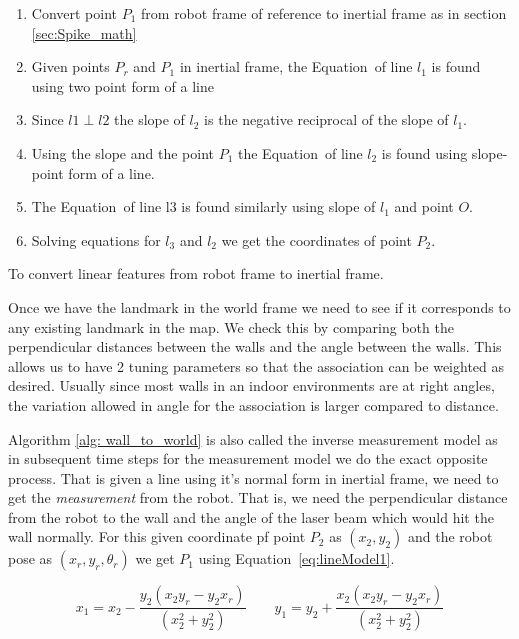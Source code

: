 \begin{algorithm}[]
	\begin{enumerate}
		\item Convert point $ P_1 $ from robot frame of reference to inertial frame as in section \ref{sec:Spike_math}
		\item Given points $ P_r $ and $ P_1 $ in inertial frame, the Equation~of line $ l_1 $ is found using two point form of a line
		\item Since $ l1 \perp l2 $ the slope of $ l_2 $ is the negative reciprocal of the slope of $ l_1 $. 
		\item Using the slope and the point $ P_1 $ the Equation~of line $ l_2 $ is found using slope-point form of a line.
		\item The Equation~of line l3 is found similarly using slope of $ l_1 $ and point $ O $. 
		\item Solving equations for $ l_3 $ and $ l_2 $ we get the coordinates of point $ P_2 $. 
	\end{enumerate}
\caption{To convert linear features from robot frame to inertial frame.}
\label{alg: wall_to_world}
\end{algorithm}

Once we have the landmark in the world frame we need to see if it corresponds to any existing landmark in the map. We check this by comparing both the perpendicular distances between the walls and the angle between the walls. This allows us to have 2 tuning parameters so that the association can be weighted as desired. Usually since most walls in an indoor environments are at right angles, the variation allowed in angle for the association is larger compared to distance. 

Algorithm \ref{alg: wall_to_world} is also called the inverse measurement model as in subsequent time steps for the measurement model we do the exact opposite process. That is given a line using it's normal form in inertial frame, we need to get the \textit{measurement} from the robot. That is, we need the perpendicular distance from the robot to the wall and the angle of the laser beam which would hit the wall normally. For this given coordinate pf point $ P_2 $ as $ (x_2,y_2) $ and the robot pose as $ (x_r,y_r,\theta_r) $ we get $ P_1 $ using Equation~\ref{eq:lineModel1}. 

\begin{equation}
	\label{eq:lineModel1}
	x_1 = x_2 - \frac{y_2 ( x_2 y_ r- y_2 x_r)}{(x_2^2 + y_2^2)}
	\qquad
	y_1 = y_2 + \frac{x_2 ( x_2 y_ r- y_2 x_r)}{(x_2^2 + y_2^2)}
\end{equation}

